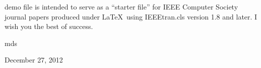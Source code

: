 \documentclass[12pt,journal,compsoc]{IEEEtran}
\begin{document}
% 
% 
% 
% 
 demo file is intended to serve as a ``starter file''
for IEEE Computer Society journal papers produced under \LaTeX\ using
IEEEtran.cls version 1.8 and later.
I wish you the best of success.

\hfill mds
 
\hfill December 27, 2012





%
%
\end{document}

